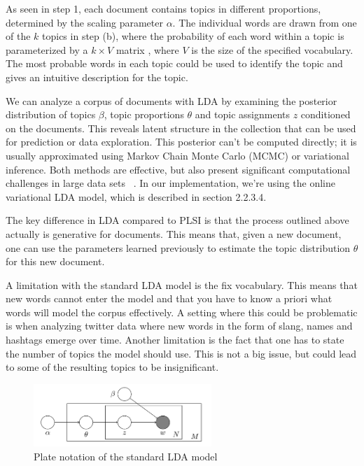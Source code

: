 \documentclass[12pt]{report}
\begin{document}
As seen in step 1, each document contains topics in different proportions,
determined by the scaling parameter $\alpha$. The individual words are drawn
from one of the $k$ topics in step (b), where the probability of each word
within a topic is parameterized by a $k \times V$ matrix , where $V$ is the
size of the specified vocabulary. The most probable words in each topic could
be used to identify the topic and gives an intuitive description for the topic.

We can analyze a corpus of documents with LDA by examining the posterior
distribution of topics $\beta$, topic proportions $\theta$ and topic
assignments $z$ conditioned on the documents. This reveals latent structure in
the collection that can be used for prediction or data exploration. This
posterior can't be computed directly; it is usually approximated using Markov
Chain Monte Carlo (MCMC) or variational inference. Both methods are effective,
but also present significant computational challenges in large data sets
~\cite{onlineLDAvb}. In our implementation, we're using the online variational
LDA model, which is described in section 2.2.3.4.
 
The key difference in LDA compared to PLSI is that the process outlined above
actually is generative for documents. This means that, given a new document,
one can use the parameters learned previously to estimate the topic
distribution $\theta$ for this new document.
 
A limitation with the standard LDA model is the fix vocabulary. This means that
new words cannot enter the model and that you have to know a priori what words
will model the corpus effectively. A setting where this could be problematic is
when analyzing twitter data where new words in the form of slang, names and
hashtags emerge over time. Another limitation is the fact that one has to state
the number of topics the model should use. This is not a big issue, but could
lead to some of the resulting topics to be insignificant.

\begin{figure}
\centering
\includegraphics[width=0.6\textwidth]{LDA_standard_model.png}
\caption{Plate notation of the standard LDA model}
\end{figure}
\end{document}
